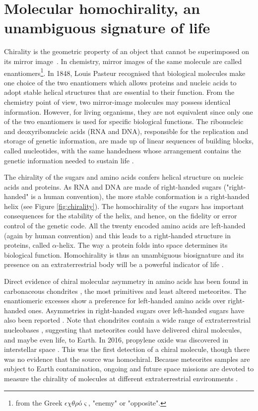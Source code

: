 \documentclass[a4paper,11pt]{article}
\begin{document}
\section{Molecular homochirality, an unambiguous signature of life}


Chirality is the geometric property of an object that cannot be superimposed on its mirror image~\citep{kelvin1894}. In chemistry,  mirror images of the same molecule are called enantiomers\footnote{from the Greek $\epsilon\chi\theta\rho$\'o$\varsigma$, "enemy" or "opposite".}.  In 1848, Louis Pasteur recognised that biological molecules make one choice of the two enantiomers \citep{pasteur1848} which allows  proteins and nucleic acids to adopt stable helical structures that are essential to their function. From the chemistry point of view, two mirror-image molecules may possess identical information. However, for living organisms, they are not equivalent since only one of the two enantiomers is used for specific biological functions. The ribonucleic and deoxyribonucleic acids (RNA and DNA), responsible for the replication and storage of genetic information, are made up of linear sequences of  building blocks, called nucleotides, with the same handedness whose arrangement contains the genetic information needed to sustain life \citep{schrodinger1944,shannon1948, watson1953, shinitzky2007}.  

The chirality of the sugars and amino acids confers helical structure on nucleic acids and proteins.  As RNA and DNA are made of right-handed sugars ("right-handed" is a human convention), the more stable conformation is a right-handed helix (see Figure \ref{fig:chirality}). The homochirality of the sugars has important consequences for the stability of the helix, and hence, on the fidelity or error control of the genetic code. All the twenty encoded amino acids are left-handed (again by human convention) and this leads to a right-handed structure in proteins, called $\alpha$-helix.  The way a protein folds into space determines its biological function.  Homochirality is thus an unambiguous biosignature and its presence on an extraterrestrial body will be a powerful indicator of life \cite{avnir20,Patty21}. 

 Direct evidence of chiral molecular asymmetry in amino acids   
 has been  found in carbonaceous chondrites \citep{cronin1997},
 the most primitives and least altered meteorites.  The enantiomeric excesses  \cite[up to 15\%, e.g.][]{burton08} show a preference for left-handed amino acids over right-handed ones.  Asymmetries in right-handed sugars over left-handed sugars have also been reported \citep{cooper2016}.  Note that chondrites contain a wide range of extraterrestrial nucleobases \citep{martins2008}, suggesting that meteorites could have delivered  chiral molecules, and maybe even life, to Earth. In 2016, propylene oxide was discovered in interstellar space \citep{mcguire2016}. This was the first detection of a chiral molecule, though there was no evidence that the source was homochiral. Because meteorites samples are subject to Earth contamination, ongoing and future space missions are devoted to measure the chirality of molecules at different extraterrestrial environments \citep{glavin2019}. 
\end{document}
